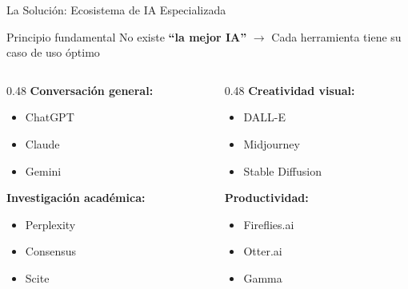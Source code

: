 \documentclass[aspectratio=169,xcolor={dvipsnames}]{beamer}
\begin{document}
	\begin{frame}{La Solución: Ecosistema de IA Especializada}
		
		\begin{alertblock}{Principio fundamental}
			No existe \textbf{``la mejor IA''} $\rightarrow$ Cada herramienta tiene su caso de uso óptimo
		\end{alertblock}
		
		\vspace{0.5cm}
		
		\begin{columns}[T]
			\begin{column}{0.48\textwidth}
				\textbf{Conversación general:}
				\begin{itemize}
					\item ChatGPT
					\item Claude
					\item Gemini
				\end{itemize}
				
				\vspace{0.3cm}
				
				\textbf{Investigación académica:}
				\begin{itemize}
					\item Perplexity
					\item Consensus
					\item Scite
				\end{itemize}
			\end{column}
			
			\begin{column}{0.48\textwidth}
				\textbf{Creatividad visual:}
				\begin{itemize}
					\item DALL-E
					\item Midjourney
					\item Stable Diffusion
				\end{itemize}
				
				\vspace{0.3cm}
				
				\textbf{Productividad:}
				\begin{itemize}
					\item Fireflies.ai
					\item Otter.ai
					\item Gamma
				\end{itemize}
			\end{column}
		\end{columns}
		
	\end{frame}
	
\end{document}
